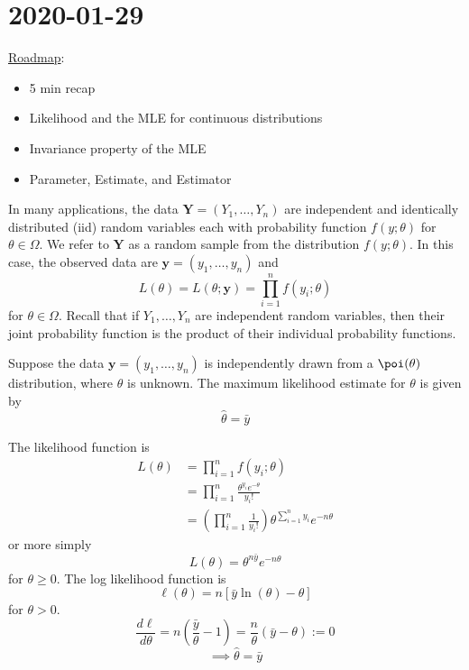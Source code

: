\section{2020-01-29}
\underline{Roadmap}:
\begin{itemize}
    \item 5 min recap
    \item Likelihood and the MLE for continuous distributions
    \item Invariance property of the MLE
    \item Parameter, Estimate, and Estimator
\end{itemize}

\begin{Definition}{}{}
    In many applications, the data $ \symbf{Y}=(Y_1,\ldots ,Y_n) $ are independent
    and identically distributed (iid) random variables each with probability function
    $ f(y;\theta) $ for $ \theta\in\Omega $. We refer to $ \symbf{Y} $
    as a random sample from the distribution $ f(y;\theta) $. In this case,
    the observed data are $ \symbf{y}=(y_1,\ldots ,y_n) $ and
    \[ L(\theta)=L(\theta;\symbf{y})=\prod_{i=1}^n f(y_i;\theta) \]
    for $ \theta\in\Omega $. Recall that if $ Y_1,\ldots ,Y_n $ are
    independent random variables, then their joint probability function is
    the product of their individual probability functions.
\end{Definition}



\begin{Proposition}{}{}
    Suppose the data $ \symbf{y}=(y_1,\ldots ,y_n) $ is independently
    drawn from a $ \poi(\theta) $ distribution, where $ \theta $ is unknown.
    The maximum likelihood estimate for $ \theta $ is given by
    \[ \hat{\theta}=\bar{y} \]
\end{Proposition}

\begin{Proof}{}{}
    The likelihood function is
    \begin{align*}
        L(\theta) & =
        \prod_{i=1}^n f(y_i;\theta)                                     \\
                  & =\prod_{i=1}^n \frac{\theta^{y_i}e^{-\theta}}{y_i!} \\
                  & =\left( \prod_{i=1}^n  \frac{1}{y_i!} \right)
        \theta^{\sum\limits_{i=1}^{n} y_i}e^{-n\theta}
    \end{align*}
    or more simply
    \[ L(\theta)=\theta^{n\bar{y}}e^{-n\theta} \]
    for $ \theta\geqslant 0 $. The log likelihood function is
    \[ \ell(\theta)=n\left[ \bar{y}\ln(\theta)-\theta \right] \]
    for $ \theta>0 $.
    \[ \frac{d\ell}{d\theta} =n\left( \frac{\bar{y}}{\theta}-1 \right)=\frac{n}{\theta}
        \left( \bar{y}-\theta \right):=0 \]
    \[ \implies \hat{\theta}=\bar{y} \]
\end{Proof}


